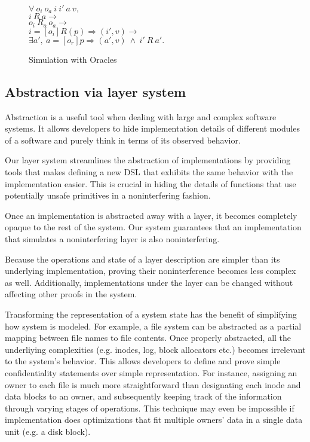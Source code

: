 \begin{figure}[H]
$\forall\ o_i\ o_a\ i\ i'\ a\ v,$\\
$i\ R\ a \rightarrow$\\
$o_i\ R_o\ o_a \rightarrow$\\
$i =[o_i] R(p)\Rightarrow (i', v) \rightarrow$\\
$\exists a',\ a =[o_r] p\Rightarrow (a', v)\ \wedge\ i'\ R\ a'.$\\
	\caption{Simulation with Oracles}
\end{figure}

\subsection{Abstraction via layer system}
Abstraction is a useful tool when dealing with large and complex software systems.
It allows developers to hide implementation details of different modules of a software and purely think in terms of its observed behavior.

Our layer system streamlines the abstraction of implementations by providing tools that makes defining a new DSL that exhibits the same behavior with the implementation easier.
This is crucial in hiding the details of functions that use potentially unsafe primitives in a noninterfering fashion.

Once an implementation is abstracted away with a layer, it becomes completely opaque to the rest of the system. Our system guarantees that an implementation that simulates a noninterfering layer is also noninterfering.

Because the operations and state of a layer description are simpler than its underlying implementation, proving their noninterference becomes less complex as well. Additionally, implementations under the layer can be changed without affecting other proofs in the system.

Transforming the representation of a system state has the benefit of simplifying how system is modeled. For example, a file system can be abstracted as a partial mapping between file names to file contents. Once properly abstracted, all the underliying complexities (e.g. inodes, log, block allocators etc.) becomes irrelevant to the system's behavior. This allows developers to define and prove simple confidentiality statements over simple representation. For instance, assigning an owner to each file is much more straightforward than designating each inode and data blocks to an owner, and subsequently keeping track of the information through varying stages of operations. This technique may even be impossible if implementation does optimizations that fit multiple owners' data in a single data unit (e.g. a disk block).

